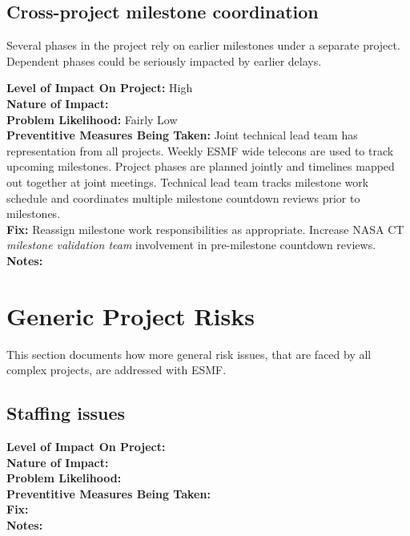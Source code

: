 \documentclass[english]{article}
\newcommand{\sreq}[1]{\subsection{\hspace{.2in}#1}}
\newenvironment
{reqlist}
{\begin{list} {} {} \rm \item[]}
{\end{list}}
\begin{document}
\sreq{Cross-project milestone coordination}
Several phases in the project rely on earlier milestones under a separate
project. Dependent phases could be seriously impacted by earlier delays.
\begin{reqlist}
{\bf Level of Impact On Project:} High \\
{\bf Nature of Impact:} \\
{\bf Problem Likelihood:} Fairly Low \\
{\bf Preventitive Measures Being Taken:} Joint technical lead team has representation
from all projects. Weekly ESMF wide telecons are used to track upcoming
milestones. Project phases are planned jointly and timelines mapped out
together at joint meetings. Technical lead team tracks milestone
work schedule and coordinates multiple milestone countdown reviews prior 
to milestones.
\\
{\bf Fix:} Reassign milestone work responsibilities as appropriate.
Increase NASA CT {\it milestone validation team} involvement in pre-milestone
countdown reviews.
\\
{\bf Notes:} 
\end{reqlist}

\section{Generic Project Risks}

This section documents how more general risk issues, that are faced by all complex projects,
are addressed with ESMF.

\sreq{Staffing issues}
\begin{reqlist}
{\bf Level of Impact On Project:} \\
{\bf Nature of Impact:} \\
{\bf Problem Likelihood:} \\
{\bf Preventitive Measures Being Taken:} \\
{\bf Fix:} \\
{\bf Notes:} 
\end{reqlist}
\end{document}
